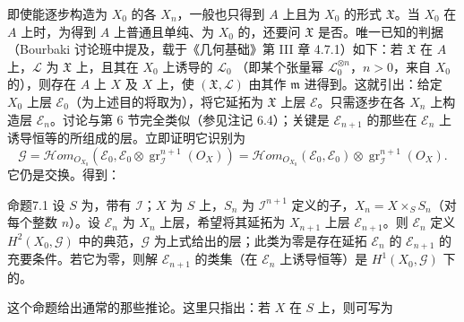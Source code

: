 即使能逐步构造为 $X_0$ 的各 $X_n$，一般也只得到 $A$ 上且为 $X_0$ 的形式 $\mathfrak X$。当 $X_0$ 在 $A$ 上时，为得到 $A$ 上普通且单纯、为 $X_0$ 的，还要问 $\mathfrak X$ 是否。唯一已知的判据（Bourbaki 讨论班中提及，载于《几何基础》第 III 章 4.7.1）如下：若 $\mathfrak X$ 在 $A$ 上，$\mathcal L$ 为 $\mathfrak X$ 上，且其在 $X_0$ 上诱导的 $\mathcal L_0$ （即某个张量幂 $\mathcal L_0^{\otimes n}$，$n>0$，来自 $X_0$ 的），则存在 $A$ 上 $X$ 及 $X$ 上，使 $(\mathfrak X,\mathcal L)$ 由其作 $\mathfrak m$ 进得到。这就引出：给定 $X_0$ 上层 $\mathcal E_0$（为上述目的将取为），将它延拓为 $\mathfrak X$ 上层 $\mathcal E$。只需逐步在各 $X_n$ 上构造层 $\mathcal E_n$。讨论与第 6 节完全类似（参见注记 6.4）；关键是 $\mathcal E_{n+1}$ 的那些在 $\mathcal E_n$ 上诱导恒等的所组成的层。立即证明它识别为
\[\mathcal G=\mathcal H\!om_{O_{X_0}}(\mathcal E_0,\mathcal E_0\otimes\operatorname{gr}^{n+1}_{\mathcal I}(O_X))=\mathcal H\!om_{O_{X_0}}(\mathcal E_0,\mathcal E_0)\otimes\operatorname{gr}^{n+1}_{\mathcal I}(O_X).\tag{*}\]
它仍是交换。得到：
\begin{SGAresult}{命题}{7.1}
设 $S$ 为，带有 $\mathcal I$；$X$ 为 $S$ 上，$S_n$ 为 $\mathcal I^{n+1}$ 定义的子，$X_n=X\times_S S_n$（对每个整数 $n$）。设 $\mathcal E_n$ 为 $X_n$ 上层，希望将其延拓为 $X_{n+1}$ 上层 $\mathcal E_{n+1}$。则 $\mathcal E_n$ 定义 $H^2(X_0,\mathcal G)$ 中的典范，$\mathcal G$ 为上式给出的层；此类为零是存在延拓 $\mathcal E_n$ 的 $\mathcal E_{n+1}$ 的充要条件。若它为零，则解 $\mathcal E_{n+1}$ 的类集（在 $\mathcal E_n$ 上诱导恒等）是 $H^1(X_0,\mathcal G)$ 下的。
\end{SGAresult}
这个命题给出通常的那些推论。这里只指出：若 $X$ 在 $S$ 上，则可写为
